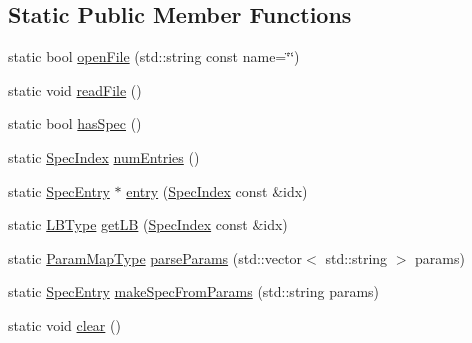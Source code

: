 \subsection*{Static Public Member Functions}
\begin{DoxyCompactItemize}
\item 
static bool \hyperlink{structvt_1_1vrt_1_1collection_1_1balance_1_1_read_l_b_spec_a17dc2fc7785cd6519440c080a472af05}{open\+File} (std\+::string const name=\char`\"{}\char`\"{})
\item 
static void \hyperlink{structvt_1_1vrt_1_1collection_1_1balance_1_1_read_l_b_spec_a4a6d3bd1ef9a432a33518d42c92d9e9b}{read\+File} ()
\item 
static bool \hyperlink{structvt_1_1vrt_1_1collection_1_1balance_1_1_read_l_b_spec_a38f65064cd81275eb9c9d596d0f0a35f}{has\+Spec} ()
\item 
static \hyperlink{namespacevt_1_1vrt_1_1collection_1_1balance_a72a5e0d9936ddf57f8e6c64e0e9fd123}{Spec\+Index} \hyperlink{structvt_1_1vrt_1_1collection_1_1balance_1_1_read_l_b_spec_ab7a988ed27206ee728474ad200c47291}{num\+Entries} ()
\item 
static \hyperlink{structvt_1_1vrt_1_1collection_1_1balance_1_1_spec_entry}{Spec\+Entry} $\ast$ \hyperlink{structvt_1_1vrt_1_1collection_1_1balance_1_1_read_l_b_spec_af9e1e7f7ea03e6a7bc06d38c2ca28544}{entry} (\hyperlink{namespacevt_1_1vrt_1_1collection_1_1balance_a72a5e0d9936ddf57f8e6c64e0e9fd123}{Spec\+Index} const \&idx)
\item 
static \hyperlink{namespacevt_1_1vrt_1_1collection_1_1balance_ac4f99693509affcc67db182d4aad9b5c}{L\+B\+Type} \hyperlink{structvt_1_1vrt_1_1collection_1_1balance_1_1_read_l_b_spec_a55d8e971ad0821c272aeb3c20455c389}{get\+LB} (\hyperlink{namespacevt_1_1vrt_1_1collection_1_1balance_a72a5e0d9936ddf57f8e6c64e0e9fd123}{Spec\+Index} const \&idx)
\item 
static \hyperlink{structvt_1_1vrt_1_1collection_1_1balance_1_1_read_l_b_spec_a01c2aa3a9e92be646c37f24afda6afa2}{Param\+Map\+Type} \hyperlink{structvt_1_1vrt_1_1collection_1_1balance_1_1_read_l_b_spec_a69993cae4576e25d70929e95dad81d7e}{parse\+Params} (std\+::vector$<$ std\+::string $>$ params)
\item 
static \hyperlink{structvt_1_1vrt_1_1collection_1_1balance_1_1_spec_entry}{Spec\+Entry} \hyperlink{structvt_1_1vrt_1_1collection_1_1balance_1_1_read_l_b_spec_a4a3fc33794511c6d74d6e4a70eb72682}{make\+Spec\+From\+Params} (std\+::string params)
\item 
static void \hyperlink{structvt_1_1vrt_1_1collection_1_1balance_1_1_read_l_b_spec_aa92db6434f6eb0839312f914139d296c}{clear} ()
\end{DoxyCompactItemize}
